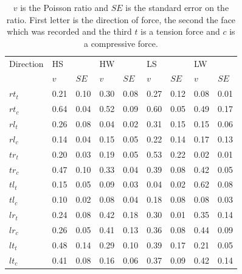 \documentclass[10pt]{article}
\begin{document}
\begin{table}
\caption[Poisson ratios]{\(v\) is the Poisson ratio and \(SE\) is the standard error on the ratio. First letter is the direction of force, the second the face which was recorded and the third \(t\) is a tension force and \(c\) is a compressive force.}
\label{table:poisson ratios}
\begin{tabular}{lllllllll}
\hline
Direction& HS&& HW&& LS&&LW&\\
 & \(v\)&\(SE\)& \(v\)&\(SE\)& \(v\)&\(SE\)& \(v\)&\(SE\)\\
\hline
\(rt_t\) & 0.21 & 0.10 & 0.30 & 0.08& 0.27 & 0.12& 0.08 & 0.01\\
\(rt_c\) & 0.64 & 0.04 & 0.52 & 0.09& 0.60 & 0.05& 0.49 & 0.17\\
\(rl_t\) & 0.26 & 0.08& 0.04 & 0.02& 0.31 & 0.15& 0.15 & 0.06 \\
\(rl_c\) & 0.14 & 0.04& 0.15 & 0.05& 0.22 & 0.14& 0.17 & 0.13 \\
\(tr_t\) & 0.20 & 0.03 & 0.19 & 0.05& 0.53 & 0.22& 0.02 & 0.01\\
\(tr_c\) & 0.47 & 0.10 & 0.33 & 0.04& 0.39 & 0.08& 0.42 & 0.05\\
\(tl_t\) & 0.15 & 0.05 & 0.09 & 0.03& 0.04 & 0.02& 0.62 & 0.08\\
\(tl_c\) & 0.10 & 0.02 & 0.08 & 0.04& 0.18 & 0.08& 0.08 & 0.03\\
\(lr_t\) & 0.24 & 0.08& 0.42& 0.18& 0.30 & 0.01& 0.35 & 0.14 \\
\(lr_c\) & 0.26 & 0.05& 0.41 & 0.13& 0.36 & 0.08& 0.44 & 0.09 \\
\(lt_t\) & 0.48 & 0.14& 0.29 & 0.10& 0.39 & 0.17& 0.21 & 0.05 \\
\(lt_c\) & 0.41 & 0.08& 0.16 & 0.06& 0.37 & 0.09& 0.42 & 0.14 \\
\hline
\end{tabular}
\end{table}
\end{document}
